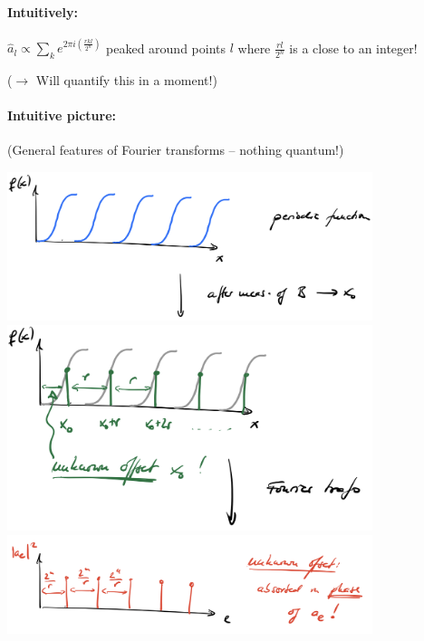 \documentclass[a4paper, 12pt]{article}
\theoremstyle{plain}
\theoremstyle{definition}
\theoremstyle{remark}
\begin{document}
\paragraph{Intuitively:} $\hat{a}_l \propto \sum_k e^{2\pi i \left(\frac{rkl}{2^n}\right)}$ peaked around points $l$ where $\frac{rl}{2^n}$ is a close to an integer!
\begin{center}
  ($\longrightarrow$ Will quantify this in a moment!)
\end{center}

\paragraph{Intuitive picture:}
\begin{center}
  (General features of Fourier transforms -- nothing quantum!)
\end{center}

\begin{center}
  \includegraphics[width=0.8\textwidth]{image-3-1.png}\\
  \includegraphics[width=0.8\textwidth]{image-3-2.png}\\
  \includegraphics[width=0.8\textwidth]{image-3-3.png}
\end{center}
\end{document}
